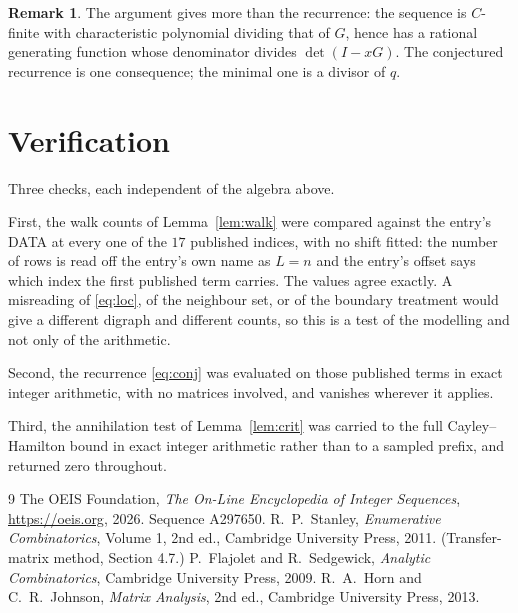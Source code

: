 \documentclass[11pt,a4paper]{article}
\theoremstyle{plain}
\theoremstyle{definition}
\newtheorem{remark}[theorem]{Remark}
\begin{document}
\begin{remark}
The argument gives more than the recurrence: the sequence is $C$-finite with characteristic
polynomial dividing that of $G$, hence has a rational generating function whose denominator
divides $\det(I-xG)$. The conjectured recurrence is one consequence; the minimal one is a
divisor of $q$.
\end{remark}

\section{Verification}

Three checks, each independent of the algebra above.

First, the walk counts of Lemma~\ref{lem:walk} were compared against the entry's DATA at
every one of the $17$ published indices, with no shift fitted: the number of rows is
read off the entry's own name as $L=n$ and the entry's offset says which index the first
published term carries. The values agree exactly. A misreading of \eqref{eq:loc}, of the
neighbour set, or of the boundary treatment would give a different digraph and different
counts, so this is a test of the modelling and not only of the arithmetic.

Second, the recurrence \eqref{eq:conj} was evaluated on those published terms in exact
integer arithmetic, with no matrices involved, and vanishes wherever it applies.

Third, the annihilation test of Lemma~\ref{lem:crit} was carried to the full
Cayley--Hamilton bound in exact integer arithmetic rather than to a sampled prefix, and
returned zero throughout.

\begin{thebibliography}{9}
 The OEIS Foundation, \emph{The On-Line Encyclopedia of Integer
Sequences}, \url{https://oeis.org}, 2026. Sequence A297650.
 R.~P.~Stanley, \emph{Enumerative Combinatorics}, Volume 1, 2nd ed.,
Cambridge University Press, 2011. (Transfer-matrix method, Section 4.7.)
 P.~Flajolet and R.~Sedgewick, \emph{Analytic Combinatorics}, Cambridge
University Press, 2009.
 R.~A.~Horn and C.~R.~Johnson, \emph{Matrix Analysis}, 2nd ed., Cambridge
University Press, 2013.
\end{thebibliography}
\end{document}
